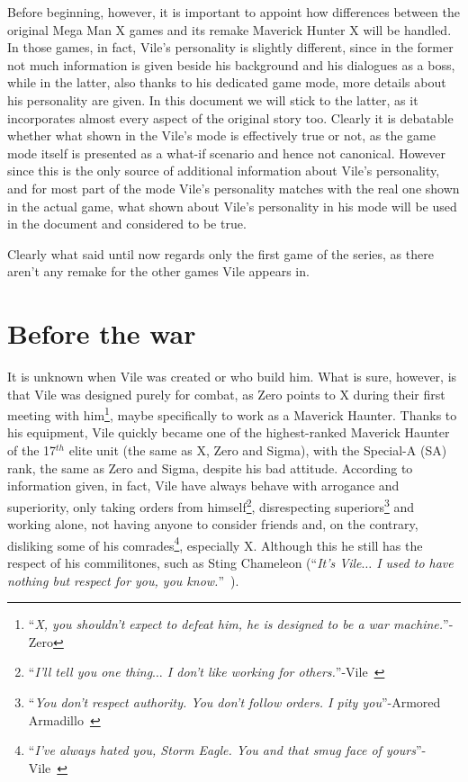 Before beginning, however, it is important to appoint how differences between the original Mega Man X games and its remake Maverick Hunter X will be handled. In those games, in fact, Vile's personality is slightly different, since in the former not much information is given beside his background and his dialogues as a boss, while in the latter, also thanks to his dedicated game mode, more details about his personality are given. In this document we will stick to the latter, as it incorporates almost every aspect of the original story too. Clearly it is debatable whether what shown in the Vile's mode is effectively true or not, as the game mode itself is presented as a what-if scenario and hence not canonical. However since this is the only source of additional information about Vile's personality, and for most part of the mode Vile's personality matches with the real one shown in the actual game, what shown about Vile's personality in his mode will be used in the document and considered to be true.

Clearly what said until now regards only the first game of the series, as there aren't any remake for the other games Vile appears in.

\section{Before the war}
It is unknown when Vile was created or who build him. What is sure, however, is that Vile was designed purely for combat, as Zero points to X during their first meeting with him\footnote{``\textit{X, you shouldn't expect to defeat him, he is designed to be a war machine.}''- Zero}, maybe specifically to work as a Maverick Haunter. Thanks to his equipment, Vile quickly became one of the highest-ranked Maverick Haunter of the 17$^{th}$ elite unit (the same as X, Zero and Sigma), with the Special-A (SA) rank, the same as Zero and Sigma, despite his bad attitude. According to information given, in fact, Vile have always behave with arrogance and superiority, only taking orders from himself\footnote{``\textit{I'll tell you one thing$\dots$ I don't like working for others.}''-Vile~\cite{MHX:Vile_script}}, disrespecting superiors\footnote{``\textit{You don't respect authority. You don't follow orders. I pity you}''-Armored Armadillo~\cite{MHX:Vile_script}} and working alone, not having anyone to consider friends and, on the contrary, disliking some of his comrades\footnote{``\textit{I've always hated you, Storm Eagle. You and that smug face of yours}''-Vile~\cite{MHX:Vile_script}}, especially X. Although this he still has the respect of his commilitones, such as Sting Chameleon (``\textit{It's Vile$\dots$ I used to have nothing but respect for you, you know.}''~\cite{MHX:Vile_script}).

